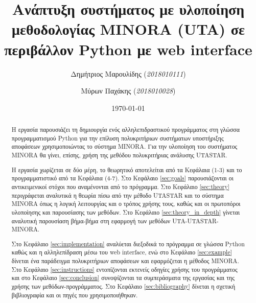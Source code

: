 \documentclass[11pt,a4paper,titlepage]{article}
\author{Δημήτριος Μαρουλίδης (\textit{2018010111}) \and
    Μύρων Παχάκης (\textit{2018010028})}
\title{Ανάπτυξη συστήματος με υλοποίηση μεθοδολογίας MINORA (UTA) σε περιβάλλον Python με web interface}
\date{\today}
\numberwithin{equation}{section}
\begin{document}
\maketitle	
\tableofcontents

\clearpage

\begin{abstract}
Η εργασία παρουσιάζει τη δημιουργία ενός αλληλεπιδραστικού προγράμματος στη γλώσσα προγραμματισμού Python για την επίλυση πολυκριτήριων συστήματων υποστήριξης αποφάσεων χρησιμοποιώντας το σύστημα MINORA. Για την υλοποίηση του συστήματος MINORA θα γίνει, επίσης, χρήση της μεθόδου πολυκριτήριας ανάλυσης UTASTAR. 

Η εργασία χωρίζεται σε δύο μέρη, το θεωρητικό αποτελείται από τα Κεφάλαια (1-3) και το προγραμματιστικό από τα Κεφάλαια (4-7). Στο Κεφάλαιο \ref{sec:goals} παρουσιάζονται οι αντικειμενικοί στόχοι που αναμένονται από το πρόγραμμα. Στο Κεφάλαιο \ref{sec:theory} περιγράφεται αναλυτικά η θεωρία πίσω από την μέθοδο UTASTAR και το σύστημα MINORA όπως η λογική λειτουργίας και ο τρόπος χρήσης τους, καθώς και οι πρωτοπόροι υλοποίησης και παρουσίασης των μεθόδων. Στο Κεφάλαιο \ref{sec:theory_in_depth} γίνεται αναλυτική παρουσίαση βήμα-βήμα στη εφαρμογή των μεθόδων UTA-UTASTAR-MINORA.

Στο Κεφάλαιο \ref{sec:implementation} αναλύεται διεξοδικά το πρόγραμμα σε γλώσσα Python καθώς και η αλληλεπίδραση μέσω του web interface, ενώ στο Κεφάλαιο \ref{sec:example} δίνεται ένα παράδειγμα πολυκριτήριων αποφάσεων και εφαρμόζεται η μέθοδος MINORA. Στο Κεφάλαιο \ref{sec:instructions} εντοπίζονται εκτενείς οδηγίες χρήσης του προγράμματος και στο Κεφάλαιο \ref{sec:conclusion} συνοψίζονται τα συμπεράσματα της εργασίας και της χρήσης των μεθόδων-προγράμματος. Στο Κεφάλαιο \ref{sec:bibliography} δίνεται η σχετική βιβλιογραφία και οι πηγές που χρησιμοποιήθηκαν.
\end{abstract}
\end{document}
